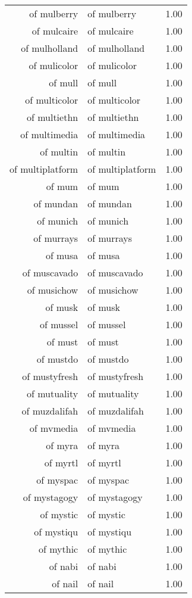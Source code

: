 \begin{table}[ht]
\begin{tabular}{rlr}
  of mulberry & of mulberry & 1.00 \\ 
  of mulcaire & of mulcaire & 1.00 \\ 
  of mulholland & of mulholland & 1.00 \\ 
  of mulicolor & of mulicolor & 1.00 \\ 
  of mull & of mull & 1.00 \\ 
  of multicolor & of multicolor & 1.00 \\ 
  of multiethn & of multiethn & 1.00 \\ 
  of multimedia & of multimedia & 1.00 \\ 
  of multin & of multin & 1.00 \\ 
  of multiplatform & of multiplatform & 1.00 \\ 
  of mum & of mum & 1.00 \\ 
  of mundan & of mundan & 1.00 \\ 
  of munich & of munich & 1.00 \\ 
  of murrays & of murrays & 1.00 \\ 
  of musa & of musa & 1.00 \\ 
  of muscavado & of muscavado & 1.00 \\ 
  of musichow & of musichow & 1.00 \\ 
  of musk & of musk & 1.00 \\ 
  of mussel & of mussel & 1.00 \\ 
  of must & of must & 1.00 \\ 
  of mustdo & of mustdo & 1.00 \\ 
  of mustyfresh & of mustyfresh & 1.00 \\ 
  of mutuality & of mutuality & 1.00 \\ 
  of muzdalifah & of muzdalifah & 1.00 \\ 
  of mvmedia & of mvmedia & 1.00 \\ 
  of myra & of myra & 1.00 \\ 
  of myrtl & of myrtl & 1.00 \\ 
  of myspac & of myspac & 1.00 \\ 
  of mystagogy & of mystagogy & 1.00 \\ 
  of mystic & of mystic & 1.00 \\ 
  of mystiqu & of mystiqu & 1.00 \\ 
  of mythic & of mythic & 1.00 \\ 
  of nabi & of nabi & 1.00 \\ 
  of nail & of nail & 1.00 \\ 

\end{tabular}
\end{table}

